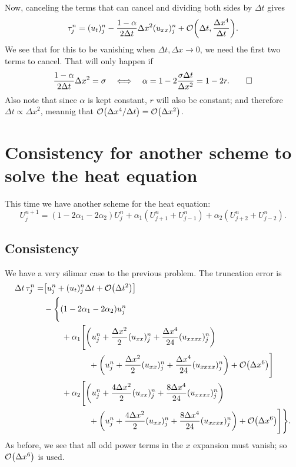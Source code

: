 \documentclass[11pt,letter, swedish, english
]{article}
\newcommand{\Dx}{\ensuremath{\Delta{x}}}
\newcommand{\Dt}{\ensuremath{\Delta{t}}}
\begin{document}
Now, canceling the terms that can cancel and dividing both sides by
$\Dt$ gives
\begin{equation}
\tau_j^n=(u_t)_j^n-\frac{1-\alpha}{2\Dt}\Dx^2(u_{xx})_j^n
+\order{\Dt, \frac{\Dx^4}{\Dt}}.
\end{equation}
We see that for this to be vanishing when $\Dt, \Dx\to0$, we need the
first two terms to cancel. That will only happen if
\begin{equation}
\frac{1-\alpha}{2\Dt}\Dx^2=\sigma
\quad\Longleftrightarrow\quad
\alpha=1-2\frac{\sigma\Dt}{\Dx^2}=1-2r.
\qed
\end{equation}
Also note that since $\alpha$ is kept constant, $r$ will also be
constant; and therefore $\Dt\propto\Dx^2$, meannig that
$\order{\Dx^4/\Dt}=\order{\Dx^2}$.

\section{Consistency for another scheme to solve the heat equation}
This time we have another scheme for the heat equation:
\begin{equation}
U_{j}^{n+1}=(1-2\alpha_1-2\alpha_2)U_{j}^{n}
+\alpha_1(U_{j+1}^n+U_{j-1}^n)+\alpha_2(U_{j+2}^n+U_{j-2}^n).
\end{equation}

\subsection{Consistency}
We have a very silimar case to the previous problem. The truncation
error is
\begin{equation}
\begin{aligned}
\Dt\,\tau_j^n=& \qty[u_j^n+(u_t)_j^n\Dt+\order{\Dt^2}]\\
&-\Bigg\{(1-2\alpha_1-2\alpha_2)u_j^n
\\ &\hspace{22pt}+\alpha_1\Bigg[
\qty(u_j^n+\frac{\Dx^2}{2}(u_{xx})_j^n+\frac{\Dx^4}{24}(u_{xxxx})_j^n)
\\ &\hspace{55pt}
+\qty(u_j^n+\frac{\Dx^2}{2}(u_{xx})_j^n+\frac{\Dx^4}{24}(u_{xxxx})_j^n)
+\order{\Dx^6}\Bigg]
\\ &\hspace{22pt}
+\alpha_2\Bigg[
\qty(u_j^n+\frac{4\Dx^2}{2}(u_{xx})_j^n+\frac{8\Dx^4}{24}(u_{xxxx})_j^n)
\\ &\hspace{55pt}
+\qty(u_j^n+\frac{4\Dx^2}{2}(u_{xx})_j^n+\frac{8\Dx^4}{24}(u_{xxxx})_j^n)
+\order{\Dx^6}\Bigg]
\Bigg\}.
\end{aligned}
\end{equation}
As before, we see that all odd power terms in the $x$ expansion must
vanish; so $\order{\Dx^6}$ is used. 
\end{document}
